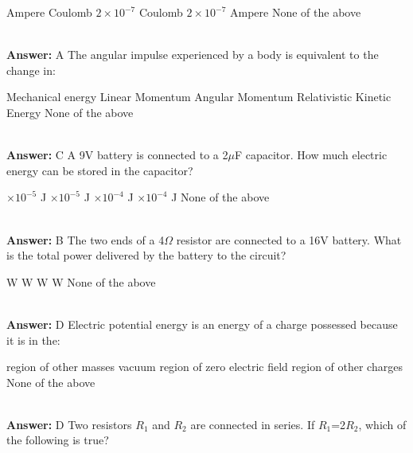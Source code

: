 \documentclass[11pt,addpoints]{exam}
\begin{document}
{{{\begin{questions}
					\begin{oneparchoices}
						 Ampere
						 Coulomb
						\choice $2\times10^{-7}$ Coulomb
						\choice $2\times10^{-7}$ Ampere
						\choice None of the above
					\end{oneparchoices}\\ \textbf{Answer:} A
					\question The angular impulse experienced by a body is equivalent to the change in:\\
					\begin{oneparchoices}
						\choice Mechanical energy
						\choice Linear Momentum
						\choice Angular Momentum
						\choice Relativistic Kinetic Energy
						\choice None of the above
					\end{oneparchoices} \\ \textbf{Answer:} C
					\question A 9V battery is connected to a 2$\mu$F capacitor. How much electric energy can be stored in the capacitor?\\
					\begin{oneparchoices}
						$\times10^{-5}$ J
						$\times10^{-5}$ J
						$\times10^{-4}$ J
						$\times10^{-4}$ J
						\choice None of the above
					\end{oneparchoices}\\ \textbf{Answer:} B
					\question The two ends of a 4$\Omega$ resistor are connected to a 16V battery. What is the total power delivered by the battery to the circuit?\\
					\begin{oneparchoices}
						 W 
						 W
						 W
						 W
						\choice None of the above
					\end{oneparchoices} \\ \textbf{Answer:} D
					\question Electric potential energy is an energy of a charge possessed because it is in the:\\
					\begin{oneparchoices}
						\choice region of other masses
						\choice vacuum
						\choice region of zero electric field
						\choice region of other charges
						\choice None of the above
					\end{oneparchoices}
					\\ \textbf{Answer:} D
					\question Two resistors $R_1$ and $R_2$ are connected in series. If $R_1$=2$R_2$, which of the following is true?\\
					\begin{oneparchoices}

\end{oneparchoices}
\end{questions}}}}
\end{document}
